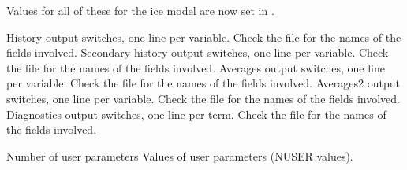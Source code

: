 \begin{klist}
Values for all of these for the ice model are now set in .
     \begin{klist}
        History output switches, one line per variable.
Check the  file for the names of the fields involved.
        Secondary history output switches, one line
       per variable.
Check the  file for the names of the fields involved.
        Averages output switches, one line per variable.
Check the  file for the names of the fields involved.
        Averages2 output switches, one line per variable.
Check the  file for the names of the fields involved.
        Diagnostics output switches, one line per term.
Check the  file for the names of the fields involved.
     \end{klist}
    \mbox{}
     \begin{klist}
           Number of user parameters
            Values of user parameters (NUSER values).
     \end{klist}
    \mbox{}

\end{klist}
